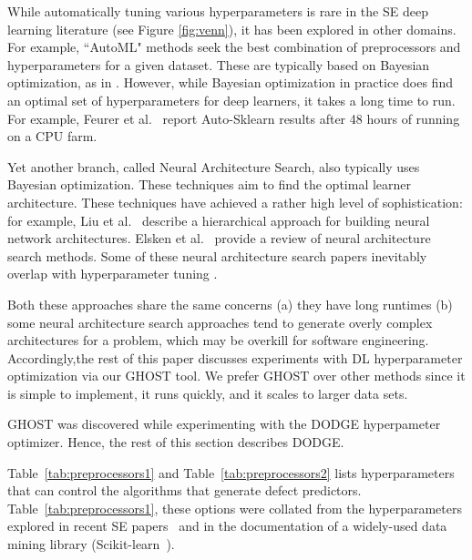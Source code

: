 \documentclass[10pt,compsoc,twocolumn]{IEEEtran}
\begin{document}
 
While automatically tuning various hyperparameters is rare in the SE deep learning literature (see  Figure \ref{fig:venn}),  it has been explored in other domains.
For example,   ``AutoML" methods seek the best combination of preprocessors and hyperparameters for a given dataset. These are typically based on Bayesian optimization, as in \cite{feurer2015efficient,thornton2013auto}. However, while Bayesian optimization in practice does find an optimal set of hyperparameters for deep learners, it takes a long time to run. For example, Feurer et al.~\cite{feurer2015efficient} report Auto-Sklearn results after 48 hours of running on a CPU farm.

Yet another branch, called Neural Architecture Search, also typically uses Bayesian optimization. These techniques aim to find the optimal learner architecture. These techniques have achieved a rather high level of sophistication: for example, Liu et al.~\cite{liu2019auto} describe a hierarchical approach for building neural network architectures. Elsken et al.~\cite{elsken2018neural} provide a review of neural architecture search methods. Some of these neural architecture search papers inevitably overlap with hyperparameter tuning \cite{bergstra2013making,domhan2015speeding,saxena2016convolutional,shahriari2015taking,stanley2002evolving}. 

Both these approaches share the same  concerns (a) they have long runtimes (b) some neural architecture search approaches tend to generate overly complex architectures for a problem, which may be overkill for software engineering. 
Accordingly,the rest of this paper discusses experiments with  DL hyperparameter optimization via our GHOST tool. We prefer GHOST  over
other methods since it is simple to implement, it runs quickly, and it scales to larger data sets. 


GHOST was discovered while experimenting with the DODGE hyperpameter optimizer.
Hence, the rest of this section describes DODGE.



  


  Table~\ref{tab:preprocessors1} and Table~\ref{tab:preprocessors2} lists    hyperparameters  that can control the algorithms that generate
defect predictors.  Table~\ref{tab:preprocessors1}, these options were collated from the hyperparameters
explored in recent SE papers~\cite{ghotra2015revisiting,fu2016tuning,agrawal2018better,agrawal2018wrong} and in  the documentation of a widely-used data mining library
(Scikit-learn~\cite{scikit-learn}).
\end{document}
